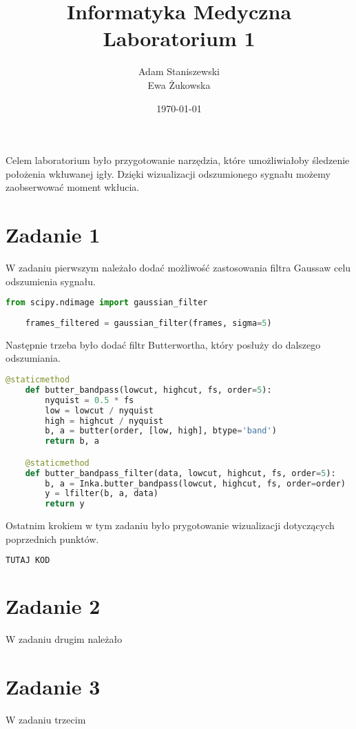 \documentclass[12pt,a4paper,table]{article}
\begin{document}
    \title{
        Informatyka Medyczna \\
        Laboratorium 1
    }
    \author{
        Adam Staniszewski \\
        Ewa Żukowska
    }

    \date{\today}

    \maketitle

    \tableofcontents
    \newpage
    Celem laboratorium było przygotowanie narzędzia, które umożliwiałoby śledzenie położenia wkłuwanej igły. Dzięki wizualizacji odszumionego sygnału możemy zaobserwować moment wkłucia.
    \section{Zadanie 1}
    W zadaniu pierwszym należało dodać możliwość zastosowania filtra Gaussaw celu odszumienia sygnału.
    \begin{lstlisting}[language=Python]
    from scipy.ndimage import gaussian_filter
    
    frames_filtered = gaussian_filter(frames, sigma=5)
    \end{lstlisting}

    \vspace{1em}
    \raggedright
    Następnie trzeba było dodać filtr Butterwortha, który posłuży do dalszego odszumiania. 

    \begin{lstlisting}[language=Python]
    @staticmethod
    def butter_bandpass(lowcut, highcut, fs, order=5):
        nyquist = 0.5 * fs
        low = lowcut / nyquist
        high = highcut / nyquist
        b, a = butter(order, [low, high], btype='band')
        return b, a

    @staticmethod
    def butter_bandpass_filter(data, lowcut, highcut, fs, order=5):
        b, a = Inka.butter_bandpass(lowcut, highcut, fs, order=order)
        y = lfilter(b, a, data)
        return y
    \end{lstlisting}

    \vspace{1em}
    \raggedright
    Ostatnim krokiem w tym zadaniu było prygotowanie wizualizacji dotyczących poprzednich punktów.

    \begin{lstlisting}[language=Python]
        TUTAJ KOD
    \end{lstlisting}
    
    \section{Zadanie 2}
    W zadaniu drugim należało 
    \section{Zadanie 3}
    W zadaniu trzecim
\end{document}
